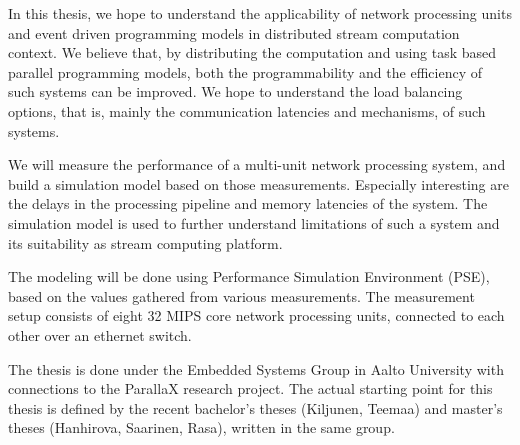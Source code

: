 In this thesis, we hope to understand the applicability of network processing units and event driven programming models in distributed stream computation context. We believe that, by distributing the computation and using task based parallel programming models, both the programmability and the efficiency of such systems can be improved. We hope to understand the load balancing options, that is, mainly the communication latencies and mechanisms, of such systems.

We will measure the performance of a multi-unit network processing system, and build a simulation model based on those measurements. Especially interesting are the delays in the processing pipeline and memory latencies of the system. The simulation model is used to further understand limitations of such a system and its suitability as stream computing platform.

The modeling will be done using Performance Simulation Environment (PSE), based on the values gathered from various measurements. The measurement setup consists of eight 32 MIPS core network processing units, connected to each other over an ethernet switch.

The thesis is done under the Embedded Systems Group in Aalto University with connections to the ParallaX research project. The actual starting point for this thesis is defined by the recent bachelor's theses (Kiljunen, Teemaa) and master's theses (Hanhirova, Saarinen, Rasa), written in the same group.

